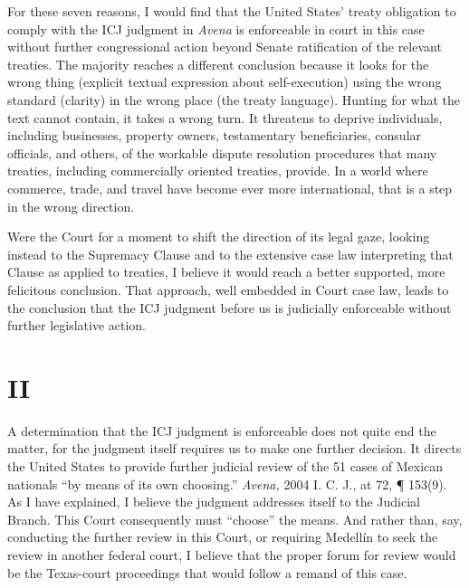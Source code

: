   For these seven reasons, I would find that the United States' treaty
obligation to comply with the ICJ judgment in \emph{Avena} is enforceable
in court in this case without further congressional action beyond Senate
ratification of the relevant treaties. The majority reaches a different
conclusion because it looks for the wrong thing (explicit textual
expression about self-execution) using the wrong standard (clarity) in
the wrong place (the treaty language). Hunting for what the text cannot
contain, it takes a wrong turn. It threatens to deprive individuals,
including businesses, property owners, testamentary beneficiaries,
consular officials, and others, of the workable dispute resolution
procedures that many treaties, including commercially oriented treaties,
provide. In a world where commerce, trade, and travel have become ever
more international, that is a step in the wrong direction.

  Were the Court for a moment to shift the direction of its legal gaze,
looking instead to the Supremacy Clause and to the extensive case law
interpreting that Clause as applied to treaties, I believe it would
reach a better supported, more felicitous conclusion. That approach,
well embedded in Court case law, leads to the conclusion that the ICJ
judgment before us is judicially enforceable without further legislative
action.

\section{II}

  A determination that the ICJ judgment is enforceable does not quite
end the matter, for the judgment itself requires us to make one further
decision. It directs the \newpage  United States to provide further
judicial review of the 51 cases of Mexican nationals ``by means of its
own choosing.'' \emph{Avena,} 2004 I. C. J., at 72, ¶ 153(9). As I
have explained, I believe the judgment addresses itself to the Judicial
Branch. This Court consequently must ``choose'' the means. And rather
than, say, conducting the further review in this Court, or requiring
Medellín to seek the review in another federal court, I believe that
the proper forum for review would be the Texas-court proceedings that
would follow a remand of this case.

